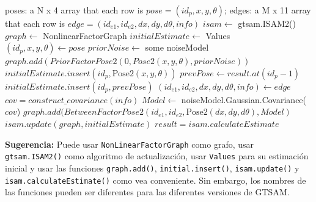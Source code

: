 \documentclass[tp]{lcc}
\begin{document}
\begin{algorithm}
    \caption{\lstinline[style=bash]{incremental_solution_2d(poses, edges)}}
    \label{alg:isam2}
    \begin{algorithmic}[1]    
    \Require poses: a N x 4 array that each row is $pose=(id_{p},x,y,\theta)$; edges: a M x 11 array that each row is $edge=(id_{e1},id_{e2},dx,dy,d\theta,info)$
    \State $isam \leftarrow$ gtsam.ISAM2() 
        \State $graph \leftarrow$ NonlinearFactorGraph 
        \State $initialEstimate \leftarrow$ Values 
        \State $(id_{p},x,y,\theta) \gets pose$ 
            \State $priorNoise \leftarrow$ some noiseModel 
            \State $graph.add(PriorFactorPose2(0,Pose2(x,y,\theta),priorNoise))$
            \State $initialEstimate.insert(id_{p},\text{Pose2}(x,y,\theta))$
        \Else {}
            \State $prevPose \gets result.at(id_{p}-1)$ 
            \State $initialEstimate.insert(id_{p},prevPose)$
        \EndIf
            \State $(id_{e1},id_{e2},dx,dy,d\theta,info) \gets edge$ 
                \State $cov=construct\_covariance(info)$ 
                \State $Model \leftarrow$ noiseModel.Gaussian.Covariance($cov$)
                \State $graph.add(BetweenFactorPose2(id_{e1},id_{e2},\text{Pose2}(dx,dy,d\theta),Model)$
            \EndIf
        \EndFor
        \State $isam.update(graph,initialEstimate)$
        \State $result=isam.calculateEstimate$
    \EndFor
    \end{algorithmic}
\end{algorithm}

\textbf{Sugerencia:} Puede usar \lstinline[style=bash]{NonLinearFactorGraph} como grafo, usar \lstinline[style=bash]{gtsam.ISAM2()} como algoritmo de actualización, usar \lstinline[style=bash]{Values} para su estimación inicial y usar las funciones \lstinline[style=bash]{graph.add()}, \lstinline[style=bash]{initial.insert()}, \lstinline[style=bash]{isam.update()} y \lstinline[style=bash]{isam.calculateEstimate()} como vea conveniente. Sin embargo, los nombres de las funciones pueden ser diferentes para las diferentes versiones de GTSAM.
\end{document}
